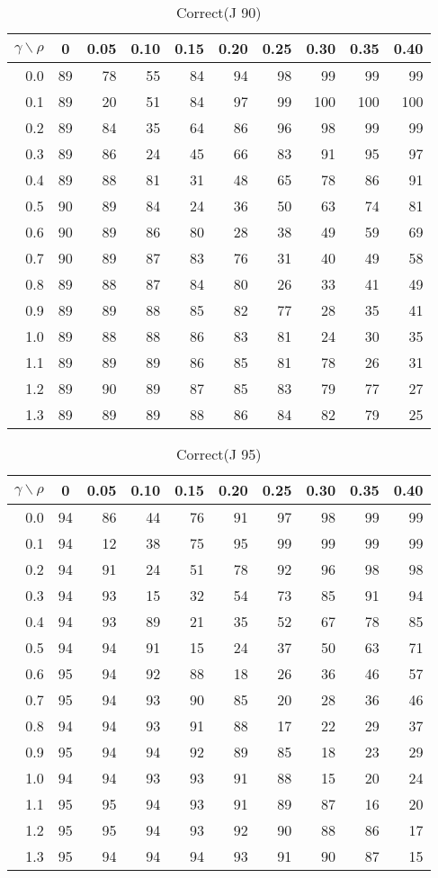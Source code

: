 \documentclass[12pt]{article}
\begin{document}
\begin{table}[!tbp]
\caption{Correct(J 90)}
 \begin{center}
 \begin{tabular}{r|rrrrrrrrr}\hline\hline
\multicolumn{1}{c|}{$\gamma\backslash\rho$}&\multicolumn{1}{c}{0}&\multicolumn{1}{c}{0.05}&\multicolumn{1}{c}{0.10}&\multicolumn{1}{c}{0.15}&\multicolumn{1}{c}{0.20}&\multicolumn{1}{c}{0.25}&\multicolumn{1}{c}{0.30}&\multicolumn{1}{c}{0.35}&\multicolumn{1}{c}{0.40}\tabularnewline
\hline




0.0&89&78&55&84&94&98& 99& 99& 99\tabularnewline
0.1&89&20&51&84&97&99&100&100&100\tabularnewline
0.2&89&84&35&64&86&96& 98& 99& 99\tabularnewline
0.3&89&86&24&45&66&83& 91& 95& 97\tabularnewline
0.4&89&88&81&31&48&65& 78& 86& 91\tabularnewline
0.5&90&89&84&24&36&50& 63& 74& 81\tabularnewline
0.6&90&89&86&80&28&38& 49& 59& 69\tabularnewline
0.7&90&89&87&83&76&31& 40& 49& 58\tabularnewline
0.8&89&88&87&84&80&26& 33& 41& 49\tabularnewline
0.9&89&89&88&85&82&77& 28& 35& 41\tabularnewline
1.0&89&88&88&86&83&81& 24& 30& 35\tabularnewline
1.1&89&89&89&86&85&81& 78& 26& 31\tabularnewline
1.2&89&90&89&87&85&83& 79& 77& 27\tabularnewline
1.3&89&89&89&88&86&84& 82& 79& 25\tabularnewline
\hline
\end{tabular}

\end{center}

\end{table}

%


\begin{table}[!tbp]
\caption{Correct(J 95)}
 \begin{center}
 \begin{tabular}{r|rrrrrrrrr}\hline\hline
\multicolumn{1}{c|}{$\gamma\backslash\rho$}&\multicolumn{1}{c}{0}&\multicolumn{1}{c}{0.05}&\multicolumn{1}{c}{0.10}&\multicolumn{1}{c}{0.15}&\multicolumn{1}{c}{0.20}&\multicolumn{1}{c}{0.25}&\multicolumn{1}{c}{0.30}&\multicolumn{1}{c}{0.35}&\multicolumn{1}{c}{0.40}\tabularnewline
\hline




0.0&94&86&44&76&91&97&98&99&99\tabularnewline
0.1&94&12&38&75&95&99&99&99&99\tabularnewline
0.2&94&91&24&51&78&92&96&98&98\tabularnewline
0.3&94&93&15&32&54&73&85&91&94\tabularnewline
0.4&94&93&89&21&35&52&67&78&85\tabularnewline
0.5&94&94&91&15&24&37&50&63&71\tabularnewline
0.6&95&94&92&88&18&26&36&46&57\tabularnewline
0.7&95&94&93&90&85&20&28&36&46\tabularnewline
0.8&94&94&93&91&88&17&22&29&37\tabularnewline
0.9&95&94&94&92&89&85&18&23&29\tabularnewline
1.0&94&94&93&93&91&88&15&20&24\tabularnewline
1.1&95&95&94&93&91&89&87&16&20\tabularnewline
1.2&95&95&94&93&92&90&88&86&17\tabularnewline
1.3&95&94&94&94&93&91&90&87&15\tabularnewline
\hline
\end{tabular}

\end{center}

\end{table}
\end{document}
